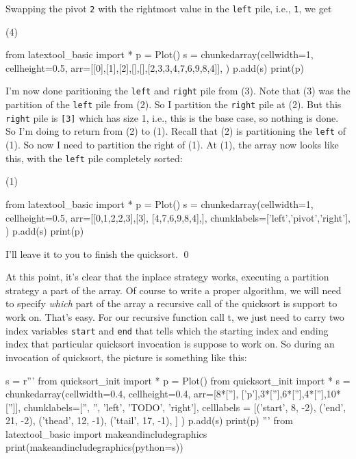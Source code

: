 \begin{ex}
Swapping the pivot \verb!2! 
with the rightmost value in the \verb!left! pile,
i.e., \verb!1!, we get
\begin{center}
(4)
\end{center}
\begin{python}
from latextool_basic import *
p = Plot()
s = chunkedarray(cellwidth=1, 
                   cellheight=0.5,
                   arr=[[0],[1],[2],[],[],[2,3,3,4,7,6,9,8,4]],
)
p.add(s)
print(p)
\end{python}
I'm now done paritioning the \verb!left! and \verb!right! pile
from (3).
Note that (3) was the partition of the \verb!left! pile from (2).
So I partition the \verb!right! pile at (2).
But this \verb!right! pile is \verb![3]! which has size 1, i.e., 
this is the base case, so nothing is done.
So I'm doing to return from (2) to (1).
Recall that (2) is partitioning the \verb!left! of (1).
So now I need to partition the right of (1).
At (1), the array now looks like this, with the \verb!left! pile 
completely sorted:
\begin{center}
(1)
\end{center}
\begin{python}
from latextool_basic import *
p = Plot()
s = chunkedarray(cellwidth=1,
                   cellheight=0.5,
                   arr=[[0,1,2,2,3],[3], [4,7,6,9,8,4],],
                   chunklabels=['left','pivot','right'],
)
p.add(s)
print(p)
\end{python}
I'll leave it to you to finish the quicksort.
\qed
\end{ex}




At this point, it's clear that the inplace
strategy works, executing a partition strategy a part of the array.
Of course to write a proper algorithm, we will need to specify
\textit{which} part of the array a recursive call of the quicksort
is support to work on.
That's easy. For our recursive function call t,
we just need to carry two index variables
\verb!start! and \verb!end! that tells which the starting
index and ending index that particular quicksort invocation
is suppose to work on.
So during an invocation of quicksort, the picture is something like this:

\begin{python}
s = r'''
from quicksort_init import *
p = Plot()
from quicksort_init import *
s = chunkedarray(cellwidth=0.4, 
                   cellheight=0.4,
                   arr=[8*[''], ['p'],3*[''],6*[''],4*[''],10*['']],
                   chunklabels=['', '', 'left', 'TODO', 'right'],
                   celllabels = [('start', 8, -2),
                                 ('end',   21, -2),
                                 ('thead', 12, -1),
                                 ('ttail', 17, -1),
                                ]
)
p.add(s)
print(p)
'''
from latextool_basic import makeandincludegraphics
print(makeandincludegraphics(python=s))
\end{python}




